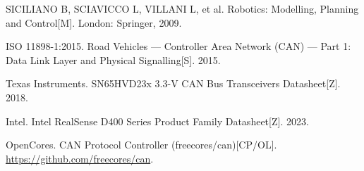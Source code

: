 {\begin{enumerate}[label={[\arabic*]},ref=\arabic*,leftmargin=2.2em,itemsep=1pt]
  \item\label{ref:robotics} SICILIANO B, SCIAVICCO L, VILLANI L, et al. Robotics: Modelling, Planning and Control[M]. London: Springer, 2009.
  \item\label{ref:can} ISO 11898-1:2015. Road Vehicles — Controller Area Network (CAN) — Part 1: Data Link Layer and Physical Signalling[S]. 2015.
  \item\label{ref:transceiver} Texas Instruments. SN65HVD23x 3.3-V CAN Bus Transceivers Datasheet[Z]. 2018.
  \item\label{ref:realsense} Intel. Intel RealSense D400 Series Product Family Datasheet[Z]. 2023.
  \item\label{ref:freecores} OpenCores. CAN Protocol Controller (freecores/can)[CP/OL]. \url{https://github.com/freecores/can}.
\end{enumerate}
}

